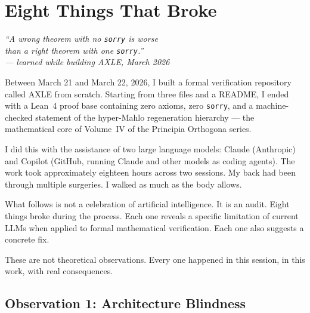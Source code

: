 
\chapter{Eight Things That Broke}
\label{ch:eight-things}

\begin{center}
\itshape
``A wrong theorem with no \texttt{sorry} is worse\\
than a right theorem with one \texttt{sorry}.''\\[0.5em]
\normalfont\small --- learned while building AXLE, March 2026
\end{center}

\vspace{0.5cm}

\noindent Between March 21 and March 22, 2026, I built a formal
verification repository called AXLE from scratch. Starting from
three files and a README, I ended with a Lean~4 proof base containing
zero axioms, zero \texttt{sorry}, and a machine-checked statement
of the hyper-Mahlo regeneration hierarchy — the mathematical core
of Volume~IV of the Principia Orthogona series.

I did this with the assistance of two large language models: Claude
(Anthropic) and Copilot (GitHub, running Claude and other models
as coding agents). The work took approximately eighteen hours across
two sessions. My back had been through multiple surgeries. I walked
as much as the body allows.

What follows is not a celebration of artificial intelligence. It is
an audit. Eight things broke during the process. Each one reveals
a specific limitation of current LLMs when applied to formal
mathematical verification. Each one also suggests a concrete fix.

These are not theoretical observations. Every one happened in this
session, in this work, with real consequences.

\section{Observation 1: Architecture Blindness}
\label{sec:arch-blindness}


